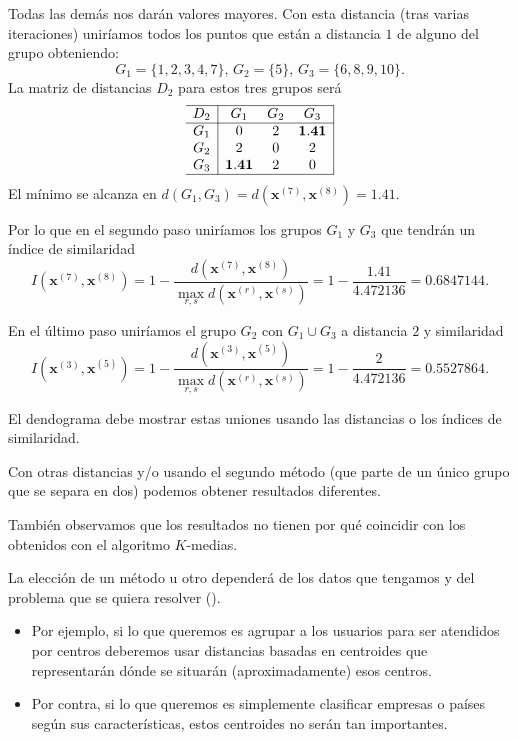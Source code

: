 Todas las demás nos darán valores mayores. Con esta distancia (tras varias iteraciones) uniríamos todos los puntos que están a distancia $1$ de alguno del grupo obteniendo:\[ G_1=\{1,2,3,4,7\},\,G_2=\{5\},\,G_3=\{6,8,9,10\}. \]
La matriz de distancias $D_2$ para estos tres grupos será \[ \begin{array}{c|ccc|}
\hline
D_2 & G_1 & G_2 & G_3 \\ \hline
G_1 & 0 & 2 & \mathbf{1.41} \\
G_2 & 2 & 0 & 2 \\
G_3 & \mathbf{1.41} & 2 & 0 \\ \hline
\end{array} \]
El mínimo se alcanza en $d(G_1,G_3)=d(\mathbf{x}^{(7)},\mathbf{x}^{(8)})=1.41$.

Por lo que en el segundo paso uniríamos los grupos $G_1$ y $G_3$ que tendrán un índice de similaridad \[ I(\mathbf{x}^{(7)},\mathbf{x}^{(8)})=1-\dfrac{d(\mathbf{x}^{(7)},\mathbf{x}^{(8)})}{\displaystyle\max_{r,s}d(\mathbf{x}^{(r)},\mathbf{x}^{(s)})}=1-\dfrac{1.41}{4.472136}=0.6847144. \]

En el último paso uniríamos el grupo $G_2$ con $G_1\cup G_3$ a distancia $2$ y similaridad \[ I(\mathbf{x}^{(3)},\mathbf{x}^{(5)})=1-\dfrac{d(\mathbf{x}^{(3)},\mathbf{x}^{(5)})}{\displaystyle\max_{r,s}d(\mathbf{x}^{(r)},\mathbf{x}^{(s)})}=1-\dfrac{2}{4.472136}=0.5527864. \]

El dendograma debe mostrar estas uniones usando las distancias o los índices de similaridad.

Con otras distancias y/o usando el segundo método (que parte de un único grupo que se separa en dos) podemos obtener resultados diferentes.

También observamos que los resultados no tienen por qué coincidir con los obtenidos con el algoritmo $K$-medias.

La elección de un método u otro dependerá de los datos que tengamos y del problema que se quiera resolver ().
\begin{itemize}
\item Por ejemplo, si lo que queremos es agrupar a los usuarios para ser atendidos por centros deberemos usar distancias basadas en centroides que representarán dónde se situarán (aproximadamente) esos centros.
\item Por contra, si lo que queremos es simplemente clasificar empresas o países según sus características, estos centroides no serán tan importantes.
\end{itemize}
